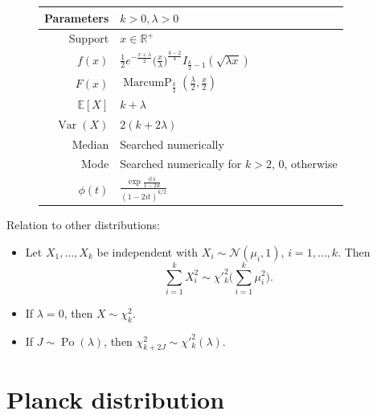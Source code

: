 \documentclass[a4paper,11pt]{article}
\theoremstyle{plain}
\theoremstyle{definition}
\newcommand{\ME}{\mathbb{E}}
\newcommand{\MR}{\mathbb{R}}
\newcommand{\Var}{\operatorname{Var}}
\begin{document}
\begin{figure}[!htb]
\begin{minipage}{0.4\textwidth}
\begin{tabular}{| r | l |}
			\hline
			Parameters & $k > 0, \lambda > 0$ \\
			\hline
			Support & $x \in \MR^+$  \\
			\hline
			$f(x)$ & $ \frac{1}{2} e^{-\frac{x+\lambda}{2}}  \Big( \frac{x}{\lambda} \Big)^{\frac{k-2}{4}} I_{\frac{k}{2}-1}(\sqrt{\lambda x})   $ \\
			\hline
			$F(x)$ & $\operatorname{MarcumP}_{\frac{k}{2}}(\frac{\lambda}{2}, \frac{x}{2}) $\\
			\hline
			$\ME[X]$ & $ k + \lambda$ \\
			\hline
			$\Var(X)$ & $2(k+2\lambda)$ \\
			\hline
			Median & Searched numerically\\
			\hline
			Mode & \pbox{\linewidth}{Searched numerically for $k > 2$, \\ $0$, otherwise}  \\
			\hline
			$\phi(t)$ & $ \frac{\exp{\frac{it\lambda}{1-2it}}}{(1-2it)^{k/2}}$ \\
			\hline
		\end{tabular}
	\end{minipage}
    \end{figure}
    Relation to other distributions: 
    \begin{itemize}
    	\item Let $X_1, \dots, X_k$ be independent with $X_i \sim \mathcal{N}(\mu_i, 1)$, $i = 1, \dots, k$. Then
    	\[
    	\sum_{i=1}^{k}X_i^2 \sim \chi'^2_k\big(\sum_{i=1}^{k}\mu_i^2\big).
    	\]
    	\item If $\lambda = 0$, then $X \sim \chi^2_k$.
    	\item If $J \sim \operatorname{Po}(\lambda)$, then $\chi^2_{k+2J} \sim \chi'^2_k(\lambda)$.
    \end{itemize}
	
	
	\pagebreak
	\section{Planck distribution}
	
\end{document}
